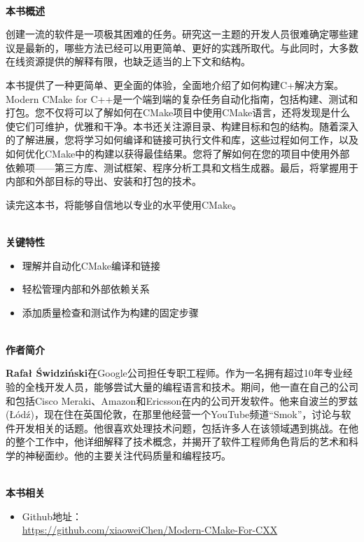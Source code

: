 \documentclass[11pt,a4paper,UTF8]{book}
\begin{document}
\begin{sloppypar}
	\hspace*{\fill} \\ %
	\noindent\textbf{本书概述}
	
	创建一流的软件是一项极其困难的任务。研究这一主题的开发人员很难确定哪些建议是最新的，哪些方法已经可以用更简单、更好的实践所取代。与此同时，大多数在线资源提供的解释有限，也缺乏适当的上下文和结构。
	
	本书提供了一种更简单、更全面的体验，全面地介绍了如何构建C+解决方案。Modern CMake for C++是一个端到端的复杂任务自动化指南，包括构建、测试和打包。您不仅将可以了解如何在CMake项目中使用CMake语言，还将发现是什么使它们可维护，优雅和干净。本书还关注源目录、构建目标和包的结构。随着深入的了解进展，您将学习如何编译和链接可执行文件和库，这些过程如何工作，以及如何优化CMake中的构建以获得最佳结果。您将了解如何在您的项目中使用外部依赖项——第三方库、测试框架、程序分析工具和文档生成器。最后，将掌握用于内部和外部目标的导出、安装和打包的技术。
	
	读完这本书，将能够自信地以专业的水平使用CMake。
	
	
	\hspace*{\fill} \\ %
	\noindent\textbf{关键特性}
	\begin{itemize}
		\item 理解并自动化CMake编译和链接
		\item 轻松管理内部和外部依赖关系
		\item 添加质量检查和测试作为构建的固定步骤
	\end{itemize}
	
	\hspace*{\fill} \\ %
	\noindent\textbf{作者简介}
	
	\textbf{Rafał Świdziński}在Google公司担任专职工程师。作为一名拥有超过10年专业经验的全栈开发人员，能够尝试大量的编程语言和技术。期间，他一直在自己的公司和包括Cisco Meraki、Amazon和Ericsson在内的公司开发软件。他来自波兰的罗兹(Łódź)，现在住在英国伦敦，在那里他经营一个YouTube频道“Smok”，讨论与软件开发相关的话题。他很喜欢处理技术问题，包括许多人在该领域遇到挑战。在他的整个工作中，他详细解释了技术概念，并揭开了软件工程师角色背后的艺术和科学的神秘面纱。他的主要关注代码质量和编程技巧。
	
	\hspace*{\fill} \\ %
	\noindent\textbf{本书相关}
	\begin{itemize}
		\item Github地址：\\\url{https://github.com/xiaoweiChen/Modern-CMake-For-CXX}
	\end{itemize}
	\newpage
	

\end{sloppypar}
\end{document}
